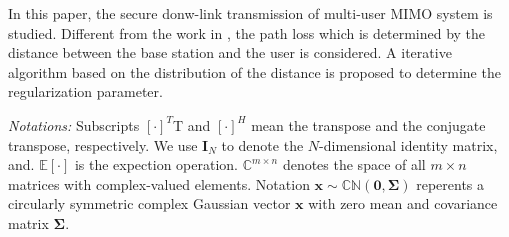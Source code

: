 \documentclass[12pt,journal,draftclsnofoot,onecolumn]{IEEEtran}
\begin{document}

In this paper, the secure donw-link transmission of multi-user MIMO system is studied. Different from the work in \cite{geraci2012secrecy,geraci2014physical}, the path loss which is determined by the distance between the base station and the user is considered. A iterative algorithm  based on the distribution of the distance is proposed to determine the regularization parameter.

\emph{Notations:} Subscripts $[\cdot]^T$T and $[\cdot]^H$ mean the transpose and
the conjugate transpose, respectively. We use $\mathbf{I}_{N}$  to denote the
$N$-dimensional identity matrix, and. $\mathbb{E}[\cdot]$ is the expection operation. $\mathbb{C}^{m \times n}$ denotes the space of all $m \times n$ matrices
with complex-valued elements. Notation $\mathbf{x} \sim \mathbb{CN}(\mathbf{0},\mathbf{\Sigma})$ reperents a
circularly symmetric complex Gaussian vector $\mathbf{x}$  with
zero mean and covariance matrix $\mathbf{\Sigma}$.
\end{document}
